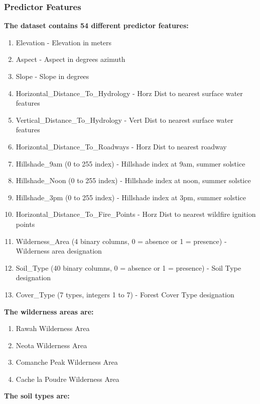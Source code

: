 \documentclass[11pt]{article}
\begin{document}
    \subsubsection*{Predictor Features}
    \textbf{The dataset contains 54 different predictor features:}
    \begin{enumerate}
        \item Elevation - Elevation in meters
        \item Aspect - Aspect in degrees azimuth
        \item Slope - Slope in degrees
        \item Horizontal\_Distance\_To\_Hydrology - Horz Dist to nearest surface water features
        \item Vertical\_Distance\_To\_Hydrology - Vert Dist to nearest surface water features
        \item Horizontal\_Distance\_To\_Roadways - Horz Dist to nearest roadway
        \item Hillshade\_9am (0 to 255 index) - Hillshade index at 9am, summer solstice
        \item Hillshade\_Noon (0 to 255 index) - Hillshade index at noon, summer solstice
        \item Hillshade\_3pm (0 to 255 index) - Hillshade index at 3pm, summer solstice
        \item Horizontal\_Distance\_To\_Fire\_Points - Horz Dist to nearest wildfire ignition points
        \item Wilderness\_Area (4 binary columns, 0 = absence or 1 = presence) - Wilderness area designation
        \item Soil\_Type (40 binary columns, 0 = absence or 1 = presence) - Soil Type designation
        \item Cover\_Type (7 types, integers 1 to 7) - Forest Cover Type designation
    \end{enumerate}

    \textbf{The wilderness areas are:}
    \begin{enumerate}
        \item Rawah Wilderness Area
        \item Neota Wilderness Area
        \item Comanche Peak Wilderness Area
        \item Cache la Poudre Wilderness Area
    \end{enumerate}

    \textbf{The soil types are:}
\end{document}
